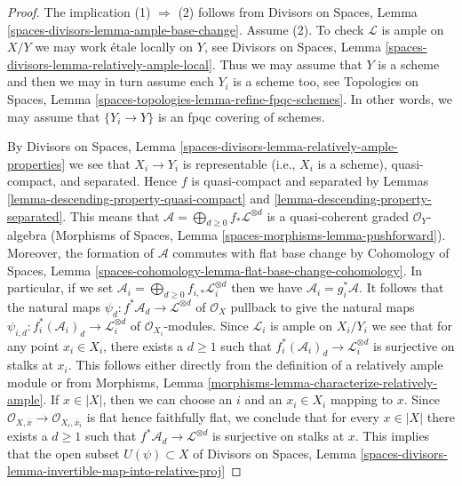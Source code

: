 \documentclass{stacks-project}
\theoremstyle{plain}
\theoremstyle{definition}
\theoremstyle{remark}
\numberwithin{equation}{subsection}
\begin{document}
\begin{proof}
The implication (1) $\Rightarrow$ (2) follows from
Divisors on Spaces, Lemma \ref{spaces-divisors-lemma-ample-base-change}.
Assume (2). To check $\mathcal{L}$ is ample on $X/Y$ we may
work \'etale locally on $Y$, see
Divisors on Spaces, Lemma \ref{spaces-divisors-lemma-relatively-ample-local}.
Thus we may assume that $Y$ is a scheme and then we may
in turn assume each $Y_i$ is a scheme too, see
Topologies on Spaces, Lemma \ref{spaces-topologies-lemma-refine-fpqc-schemes}.
In other words, we may assume that
$\{Y_i \to Y\}$ is an fpqc covering of schemes.

\medskip\noindent
By Divisors on Spaces, Lemma
\ref{spaces-divisors-lemma-relatively-ample-properties}
we see that $X_i \to Y_i$ is representable (i.e., $X_i$ is a scheme),
quasi-compact, and separated. Hence $f$ is quasi-compact and separated by
Lemmas \ref{lemma-descending-property-quasi-compact} and
\ref{lemma-descending-property-separated}.
This means that
$\mathcal{A} = \bigoplus_{d \geq 0} f_*\mathcal{L}^{\otimes d}$
is a quasi-coherent graded $\mathcal{O}_Y$-algebra
(Morphisms of Spaces, Lemma \ref{spaces-morphisms-lemma-pushforward}).
Moreover, the formation of $\mathcal{A}$ commutes with flat
base change by
Cohomology of Spaces, Lemma
\ref{spaces-cohomology-lemma-flat-base-change-cohomology}.
In particular, if we set
$\mathcal{A}_i = \bigoplus_{d \geq 0} f_{i, *}\mathcal{L}_i^{\otimes d}$
then we have $\mathcal{A}_i = g_i^*\mathcal{A}$.
It follows that the natural maps
$\psi_d : f^*\mathcal{A}_d \to \mathcal{L}^{\otimes d}$
of $\mathcal{O}_X$
pullback to give the natural maps
$\psi_{i, d} : f_i^*(\mathcal{A}_i)_d \to \mathcal{L}_i^{\otimes d}$
of $\mathcal{O}_{X_i}$-modules. Since $\mathcal{L}_i$ is ample on $X_i/Y_i$
we see that for any point $x_i \in X_i$, there exists a $d \geq 1$
such that $f_i^*(\mathcal{A}_i)_d \to \mathcal{L}_i^{\otimes d}$
is surjective on stalks at $x_i$. This follows either directly
from the definition of a relatively ample module or from
Morphisms, Lemma \ref{morphisms-lemma-characterize-relatively-ample}.
If $x \in |X|$, then we can choose an $i$ and an $x_i \in X_i$
mapping to $x$. Since
$\mathcal{O}_{X, \overline{x}} \to \mathcal{O}_{X_i, \overline{x}_i}$
is flat hence faithfully flat, we conclude that for every $x \in |X|$
there exists a $d \geq 1$ such that
$f^*\mathcal{A}_d \to \mathcal{L}^{\otimes d}$
is surjective on stalks at $x$.
This implies that the open subset $U(\psi) \subset X$ of
Divisors on Spaces, Lemma
\ref{spaces-divisors-lemma-invertible-map-into-relative-proj}

\end{proof}
\end{document}
